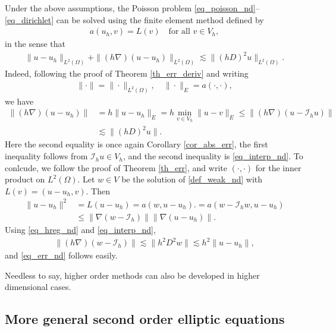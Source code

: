 \documentclass[12pt,oneside]{amsart}
\def\I{\mathcal I}
\begin{document}
Under the above assumptions, the Poisson problem \eqref{eq_poisson_nd}--\eqref{eq_dirichlet} can be solved using the finite element method defined by
    \begin{align}\label{def_fem_nd}
a(u_h,v) = L(v) \quad \text{for all $v \in V_h$},
    \end{align}
in the sense that 
    \begin{align}\label{eq_err_nd}
\|u - u_h\|_{L^2(\Omega)} + \|(h\nabla)(u - u_h)\|_{L^2(\Omega)}
\lesssim \|(hD)^2 u\|_{L^2(\Omega)}.
    \end{align}
Indeed, following the proof of Theorem \ref{th_err_deriv} and writing
    \begin{align*}
\|\cdot\| = \|\cdot\|_{L^2(\Omega)},
\quad 
\|\cdot\|_E = a(\cdot, \cdot),
    \end{align*}
we have 
    \begin{align*}
\|(h\nabla)(u-u_h)\|
&= 
h\|u-u_h\|_E 
= 
h \min_{v \in V_h}\|u-v\|_E
\le 
\|(h\nabla)(u-\I_h u)\|
\\&\lesssim
\|(hD)^2 u\|.
    \end{align*}
Here the second equality is once again Corollary \ref{cor_abs_err},
the first inequality follows from $\I_h u \in V_h$, and the second inequality is \eqref{eq_interp_nd}. 
To conlcude, we follow the proof of Theorem \ref{th_err}, 
and write $(\cdot, \cdot)$ for the inner product on $L^2(\Omega)$.
Let $w \in V$ be the solution of \eqref{def_weak_nd} with $L(v) = (u - u_h,v)$. Then 
    \begin{align*}
\|u-u_h\|^2 
&= 
L(u - u_h) 
= 
a(w, u - u_h).
= 
a(w - \I_h w, u - u_h) 
\\&\le 
\|\nabla(w - \I_h)\|\|\nabla(u-u_h)\|.
    \end{align*}
Using \eqref{eq_hreg_nd} and \eqref{eq_interp_nd},
    \begin{align*}
\|(h\nabla)(w - \I_h)\| 
\lesssim
\|h^2 D^2 w\|
\lesssim 
h^2 \|u - u_h\|,
    \end{align*}
and \eqref{eq_err_nd} follows easily.

Needless to say, higher order methods can also be developed in higher dimensional cases. 

\subsection{More general second order elliptic equations}
\end{document}
